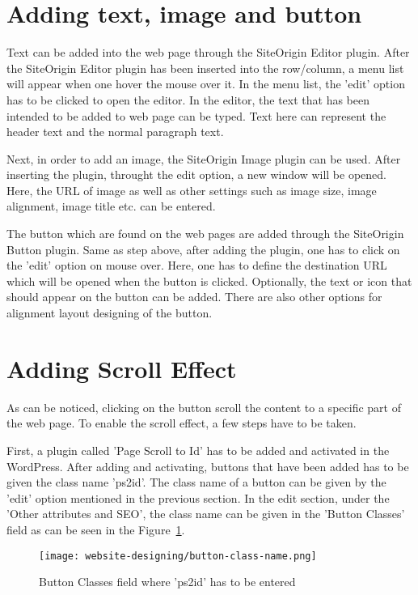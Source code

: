 \section{Adding text, image and button}
Text can be added into the web page through the SiteOrigin Editor plugin. After the SiteOrigin Editor plugin has been inserted into the row/column, a menu list will appear when one hover the mouse over it. In the menu list, the 'edit' option has to be clicked to open the editor. In the editor, the text that has been intended to be added to web page can be typed. Text here can represent the header text and the normal paragraph text.

Next, in order to add an image, the SiteOrigin Image plugin can be used. After inserting the plugin, throught the edit option, a new window will be opened. Here, the URL of image as well as other settings such as image size, image alignment, image title etc. can be entered.

The button which are found on the web pages are added through the SiteOrigin Button plugin. Same as step above, after adding the plugin, one has to click on the 'edit' option on mouse over. Here, one has to define the destination URL which will be opened when the button is clicked. Optionally, the text or icon that should appear on the button can be added. There are also other options for alignment layout designing of the button.

\section{Adding Scroll Effect}
As can be noticed, clicking on the button scroll the content to a specific part of the web page. To enable the scroll effect, a few steps have to be taken.

First, a plugin called 'Page Scroll to Id' has to be added and activated in the WordPress. After adding and activating, buttons that have been added has to be given the class name 'ps2id'. The class name of a button can be given by the 'edit' option mentioned in the previous section. In the edit section, under the 'Other attributes and SEO', the class name can be given in the 'Button Classes' field as can be seen in the Figure~\ref{button-class-name}.

\begin{figure}[ht]
\centering
\caption{Button Classes field where 'ps2id' has to be entered}
\label{button-class-name}
\texttt{[image: website-designing/button-class-name.png]}
\end{figure}

